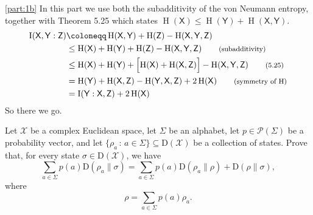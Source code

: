 \documentclass[boxes,pages,color=SeaGreen]{homework}
\newcommand{\X}{\mathcal{X}}
\renewcommand{\P}{\mathcal{P}}
\newcommand{\reg}[1]{\mathsf{#1}}
\newcommand{\ent}{\operatorname{H}}
\newcommand{\mutIn}[2]{\operatorname{I}(#1 : #2)}
\newcommand{\smalltag}[1]{\tag*{\footnotesize (#1)}}
\newcommand{\Density}{\mathrm{D}}
\begin{document}
\begin{solution}
    \ref{part:1b}
    In this part we use both the subadditivity of the von Neumann entropy, together with Theorem 5.25 which states $\ent(\reg{X}) \leq \ent(\reg{Y}) + \ent(\reg{X}, \reg{Y})$.
    \begin{align*}
        \mutIn{\reg{X}, \reg{Y}}{\reg{Z}} & \defeq \ent(\reg{X}, \reg{Y}) + \ent(\reg{Z}) - \ent(\reg{X}, \reg{Y}, \reg{Z})                                                         \\
                                          & \leq \ent(\reg{X}) + \ent(\reg{Y}) + \ent(\reg{Z}) - \ent(\reg{X}, \reg{Y}, \reg{Z}) \smalltag{subadditivity}                           \\
                                          & \leq \ent(\reg{X}) + \ent(\reg{Y}) + \qty\Big[\ent(\reg{X}) + \ent(\reg{X}, \reg{Z})] - \ent(\reg{X}, \reg{Y}, \reg{Z}) \smalltag{5.25} \\
                                          & = \ent(\reg{Y}) + \ent(\reg{X}, \reg{Z}) - \ent(\reg{Y}, \reg{X}, \reg{Z}) + 2\ent(\reg{X}) \smalltag{symmetry of $\ent$}               \\
                                          & = \mutIn{\reg{Y}}{\reg{X},\reg{Z}} + 2\ent(\reg{X})
    \end{align*}
    So there we go.
\end{solution}


\begin{problem}
Let $\X$ be a complex Euclidean space,
let $\Sigma$ be an alphabet,
let $p\in\P(\Sigma)$ be a probability vector, and
let $\{\rho_a\,:\,a\in\Sigma\}\subseteq\Density(\X)$ be a collection of
states.
Prove that, for every state $\sigma\in\Density(\X)$, we have
\[
    \sum_{a\in\Sigma} p(a) \mathrm{D}(\rho_a \| \sigma)
    = \sum_{a\in\Sigma} p(a) \mathrm{D}(\rho_a \| \rho) +
    \mathrm{D}(\rho \| \sigma),
\]
where
\[
    \rho = \sum_{a\in\Sigma} p(a) \rho_a.
\]
\end{problem}
\end{document}
